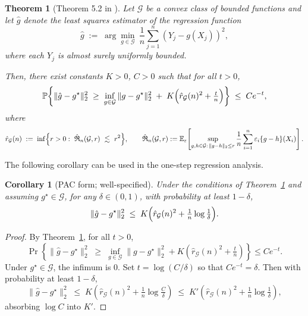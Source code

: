 \documentclass{article}
\newtheorem{theorem}{Theorem}
\newtheorem{corollary}{Corollary}
\newcommand{\E}{\mathbb{E}}
\newcommand{\1}{\mathbbm{1}}
\begin{document}
\begin{theorem}[Theorem 5.2 in \cite{koltchinskii2011oracle}]
\label{thm:ls-erm-rad}
Let \(\mathcal G\) be a convex class of bounded functions and let \(\hat g\)
denote the least squares estimator of the regression function
\[
\hat g \;:=\; \arg\min_{g\in\mathcal G}\ \frac{1}{n}\sum_{j=1}^n (Y_j - g(X_j))^2,
\]
where each \(Y_j\) is almost surely uniformly bounded.

Then, there exist constants \(K>0\), \(C>0\) such that for all \(t>0\),
\[
\mathbb P\!\left\{
\|\hat g - g^\star\|_{2}^2
\;\ge\;
\inf_{g\in\mathcal G}\|g - g^\star\|_{2}^2
\;+\; K\Bigl(\hat r_{\mathcal G}(n)^2 + \tfrac{t}{n}\Bigr)
\right\}
\;\le\; C e^{-t},
\]
where
\[
\hat r_{\mathcal G}(n)
\;:=\;\inf\Bigl\{r>0:\ \hat{\mathfrak{R}}_n(\mathcal G,r)\ \lesssim\ r^2\Bigr\},
\qquad
\hat{\mathfrak{R}}_n(\mathcal G,r)
:= \E_{\varepsilon}\!\left[
\sup_{\substack{g,h\in\mathcal G:\,\|g-h\|_2 \le r}}
\frac{1}{n}\sum_{i=1}^n \varepsilon_i\{g-h\}(X_i)
\right].
\]
\end{theorem}

The following corollary can be used in the one-step regression analysis.

\begin{corollary}[PAC form; well-specified]
\label{cor::excessLS}
Under the conditions of Theorem~\ref{thm:ls-erm-rad} and assuming
\(g^\star \in \mathcal G\), for any \(\delta\in(0,1)\), with probability at
least \(1-\delta\),
\[
\|\hat g - g^\star\|_{2}^2
\;\le\;
K\Bigl(\hat r_{\mathcal G}(n)^2 + \tfrac{1}{n}\log\tfrac{1}{\delta}\Bigr).
\]
\end{corollary}

\begin{proof}
By Theorem~\ref{thm:ls-erm-rad}, for all \(t>0\),
\[
\Pr\!\left\{
\|\hat g-g^\star\|_{2}^2
\;\ge\; \inf_{g\in\mathcal{G}}\|g-g^\star\|_{2}^2
+ K\!\left(\hat r_{\mathcal{G}}(n)^2+\tfrac{t}{n}\right)
\right\}\le C e^{-t}.
\]
Under \(g^\star\in\mathcal{G}\), the infimum is \(0\). Set
\(t=\log(C/\delta)\) so that \(Ce^{-t}=\delta\). Then with probability at
least \(1-\delta\),
\[
\|\hat g-g^\star\|_{2}^2
\;\le\; K\!\left(\hat r_{\mathcal{G}}(n)^2+\tfrac{1}{n}\log\tfrac{C}{\delta}\right)
\;\le\; K'\!\left(\hat r_{\mathcal{G}}(n)^2+\tfrac{1}{n}\log\tfrac{1}{\delta}\right),
\]
absorbing \(\log C\) into \(K'\).
\end{proof}
\end{document}
